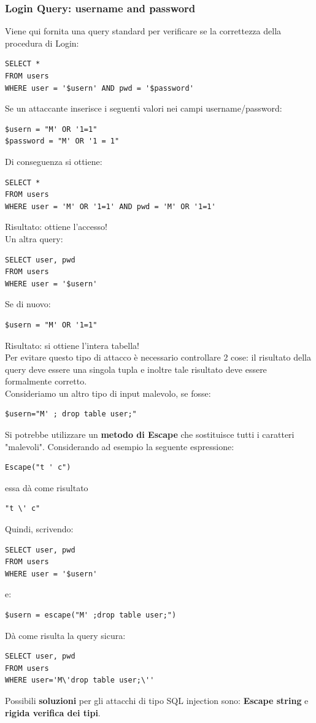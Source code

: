 \subsubsection{Login Query: username and password} 
Viene qui fornita una query standard per verificare se la correttezza della procedura di Login:
\begin{lstlisting}
SELECT * 
FROM users 
WHERE user = '$usern' AND pwd = '$password'
\end{lstlisting}
Se un attaccante inserisce i seguenti valori nei campi username/password:
\begin{lstlisting}
$usern = "M' OR '1=1"
$password = "M' OR '1 = 1"
\end{lstlisting}
Di conseguenza si ottiene:
\begin{lstlisting}
SELECT * 
FROM users 
WHERE user = 'M' OR '1=1' AND pwd = 'M' OR '1=1'
\end{lstlisting}
Risultato: ottiene l'accesso!\\
Un altra query:
\begin{lstlisting}
SELECT user, pwd 
FROM users 
WHERE user = '$usern' 
\end{lstlisting}
Se di nuovo:
\begin{lstlisting}
$usern = "M' OR '1=1" 
\end{lstlisting}
Risultato: si ottiene l'intera tabella!\\
Per evitare questo tipo di attacco è necessario controllare 2 cose: il risultato della query deve essere una singola tupla e inoltre tale risultato deve essere formalmente corretto. \\
\linebreak
Consideriamo un altro tipo di input malevolo, se fosse:  
\begin{lstlisting} 
$usern="M' ; drop table user;"
\end{lstlisting}
Si potrebbe utilizzare un \textbf{metodo di Escape} che sostituisce tutti i caratteri "malevoli".
Considerando ad esempio la seguente espressione:
\begin{lstlisting} 
Escape("t ' c") 
\end{lstlisting}
essa dà come risultato
\begin{lstlisting} 
"t \' c"
\end{lstlisting}
Quindi, scrivendo:
\begin{lstlisting} 
SELECT user, pwd 
FROM users 
WHERE user = '$usern'
\end{lstlisting}
e:
\begin{lstlisting} 
$usern = escape("M' ;drop table user;")
\end{lstlisting}
Dà come risulta la query sicura:
\begin{lstlisting} 
SELECT user, pwd 
FROM users 
WHERE user='M\'drop table user;\''
\end{lstlisting}
Possibili \textbf{soluzioni} per gli attacchi di tipo SQL injection sono: \textbf{Escape string} e \textbf{rigida verifica dei tipi}.